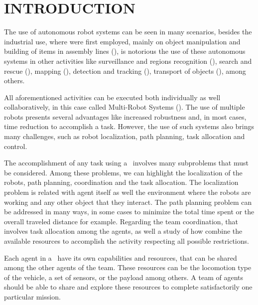 \section{INTRODUCTION}
\label{sec:introduction}



The use of autonomous robot systems can be seen in many scenarios, besides the industrial use, where were first employed, mainly on object manipulation and building of items in assembly lines (\cite{Rol2011}), is notorious the use of these autonomous systems in other activities like surveillance and regions recognition (\cite{Tanner2007, Sujit2013}), search and rescue (\cite{Casper2003, Murphy2004}), mapping (\cite{Tokekar2013}), detection and tracking (\cite{Grocholsky2006}), transport of objects (\cite{Michael2011, Fink2008}), among others.

All aforementioned activities can be executed both individually as well collaboratively, in this case called Multi-Robot Systems (\mrs).
The use of multiple robots presents several advantages like increased robustness and, in most cases, time reduction to accomplish a task. However, the use of such systems also brings many challenges, such as robot localization, path planning, task allocation and control.

The accomplishment of any task using a \mrs\ involves many subproblems that must be considered.
Among these problems, we can highlight the localization of the robots, path planning, coordination and the task allocation.
The localization problem is related with agent itself as well the environment where the robots are working and any other object that they interact.
The path planning problem can be addressed in many ways, in some cases to minimize the total time spent or the overall traveled distance for example.
Regarding the team coordination, that involves task allocation among the agents, as well a study of how combine the available resources to accomplish the activity respecting all possible restrictions.


Each agent in a \mrs\ have its own capabilities and resources, that can be shared among the other agents of the team.
These resources can be the locomotion type of the vehicle, a set of sensors, or the payload among others.
A team of agents should be able to share and explore these resources to complete satisfactorily one particular mission.

